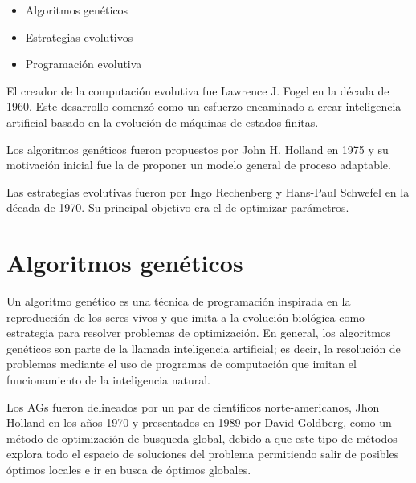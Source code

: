 \begin{itemize}
    \item Algoritmos genéticos
    \item Estrategias evolutivos
    \item Programación evolutiva
\end{itemize}

El creador de la computación evolutiva fue Lawrence J. Fogel en la década de 1960. Este desarrollo comenzó como un esfuerzo encaminado a crear inteligencia artificial basado en la evolución de máquinas de estados finitas.

Los algoritmos genéticos fueron propuestos por John H. Holland en 1975 y su motivación inicial fue la de proponer un modelo general de proceso adaptable.

Las estrategias evolutivas fueron por Ingo Rechenberg y Hans-Paul Schwefel en la década de 1970. Su principal objetivo era el de optimizar parámetros.

\section{Algoritmos genéticos}
Un algoritmo genético es una técnica de programación inspirada en la reproducción de los seres vivos y que imita a la evolución biológica como estrategia para resolver problemas de optimización. En general, los algoritmos genéticos son parte de la llamada inteligencia artificial; es decir, la resolución de problemas mediante el uso de programas de computación que imitan el funcionamiento de la inteligencia natural.\cite{Juarez2018}

Los \acrshort{AGs} fueron delineados por un par de científicos norte-americanos, Jhon Holland en los años 1970 y presentados en 1989 por David Goldberg, como un método de optimización de busqueda global, debido a que este tipo de métodos explora todo el espacio de soluciones del problema permitiendo salir de posibles óptimos locales e ir en busca de óptimos globales.\cite{Juarez2018}

